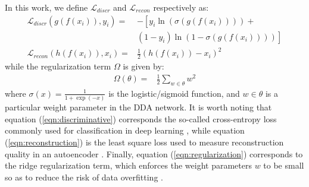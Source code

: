 In this work, we define $\mathcal{L}_{discr}$ and $\mathcal{L}_{recon}$ respectively as:
\begin{align}
\label{eqn:discriminative}
\mathcal{L}_{discr}(g(f(x_i)), y_i) = &-\left[ y_i \ln\left( \sigma(g(f(x_i))) \right) \right. + \nonumber\\
                                       &\left. (1 - y_i) \ln\left( 1 - \sigma(g(f(x_i))) \right)  \right]\\
\label{eqn:reconstruction}
\mathcal{L}_{recon}(h(f(x_i)), x_i) = &\frac{1}{2} \left( h(f(x_i)) - x_i \right)^2
\end{align}
while the regularization term $\Omega$ is given by:
\begin{align}
\label{eqn:regularization}
\Omega(\theta) = &\frac{1}{2} \sum_{w \in \theta} w^2 
\end{align}
where $\sigma(x) = \frac{1}{1 + \exp(-x)}$ is the logistic/sigmoid function, and $w \in \theta$ is a particular weight parameter in the DDA network. It is worth noting that equation (\ref{eqn:discriminative}) corresponds the so-called cross-entropy loss commonly used for classification in deep learning \cite{Rosasco2004}, while equation (\ref{eqn:reconstruction}) is the least square loss used to measure reconstruction quality in an autoencoder \cite{Vincent2010}. Finally, equation (\ref{eqn:regularization}) corresponds to the ridge regularization term, which enforces the weight parameters $w$ to be small so as to reduce the risk of data overfitting \cite{bishop2006pattern}. 


